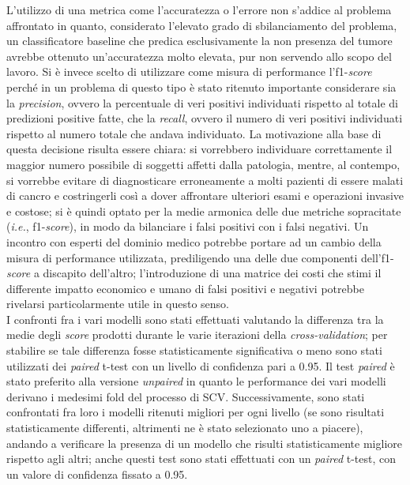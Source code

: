 L'utilizzo di una metrica come l'accuratezza o l'errore non s'addice al problema affrontato in quanto, considerato l'elevato grado di sbilanciamento del problema, un classificatore baseline che predica esclusivamente la non presenza del tumore avrebbe ottenuto un'accuratezza molto elevata, pur non servendo allo scopo del lavoro. 
Si è invece scelto di utilizzare come misura di performance l'f1-\textit{score} perché in un problema di questo tipo è stato ritenuto importante considerare sia la \textit{precision}, ovvero la percentuale di veri positivi individuati rispetto al totale di predizioni positive fatte, che la \textit{recall}, ovvero il numero di veri positivi individuati rispetto al numero totale che andava individuato. 
La motivazione alla base di questa decisione risulta essere chiara: si vorrebbero individuare correttamente il maggior numero possibile di soggetti affetti dalla patologia, mentre, al contempo, si vorrebbe evitare di diagnosticare erroneamente a molti pazienti di essere malati di cancro e costringerli così a dover affrontare ulteriori esami e operazioni invasive e costose; si è quindi optato per la medie armonica delle due metriche sopracitate (\textit{i.e.}, f1-\textit{score}), in modo da bilanciare i falsi positivi con i falsi negativi.
Un incontro con esperti del dominio medico potrebbe portare ad un cambio della misura di performance utilizzata, prediligendo una delle due componenti dell'f1-\textit{score} a discapito dell'altro; l'introduzione di una matrice dei costi che stimi il differente impatto economico e umano di falsi positivi e negativi potrebbe rivelarsi particolarmente utile in questo senso.\\
I confronti fra i vari modelli sono stati effettuati valutando la differenza tra la medie degli \textit{score} prodotti durante le varie iterazioni della \textit{cross-validation}; per stabilire se tale differenza fosse statisticamente significativa o meno sono stati utilizzati dei \textit{paired} t-test con un livello di confidenza pari a 0.95. Il test \textit{paired} è stato preferito alla versione \textit{unpaired} in quanto le performance dei vari modelli derivano i medesimi fold del processo di SCV.
Successivamente, sono stati confrontati fra loro i modelli ritenuti migliori per ogni livello (se sono risultati statisticamente differenti, altrimenti ne è stato selezionato uno a piacere), andando a verificare la presenza di un modello che risulti statisticamente migliore rispetto agli altri; anche questi test sono stati effettuati con un \textit{paired} t-test, con un valore di confidenza fissato a 0.95.

